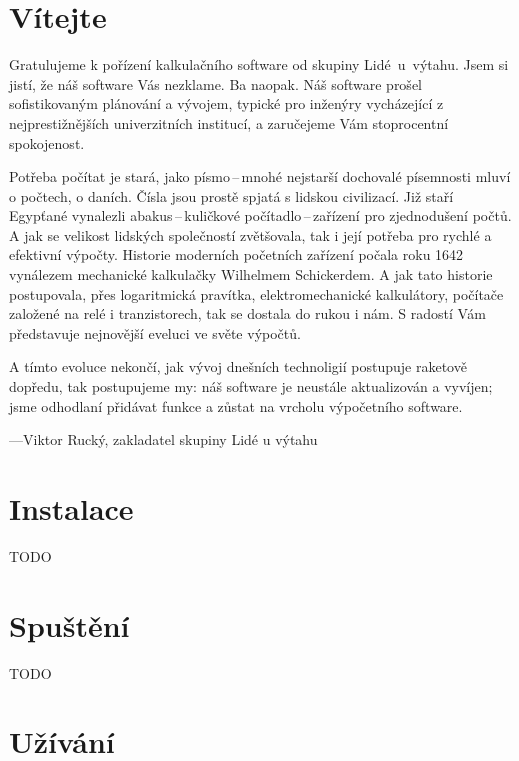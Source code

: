 \documentclass[a5paper,8pt,twoside]{extarticle}
\newcommand*\cleartoleftpage{%
  \clearpage
  \ifodd\value{page}\hbox{}\newpage\fi
}
\begin{document}
    \newpage
    \setcounter{page}{1}
    \tableofcontents
    
    \newpage

    \section*{Vítejte}
    Gratulujeme k pořízení kalkulačního software od skupiny Lidé~u~výtahu. Jsem si jistí, že náš software Vás nezklame. Ba naopak. Náš software prošel sofistikovaným plánování a vývojem, typické pro inženýry vycházející z nejprestižnějších univerzitních institucí, a zaručejeme Vám stoprocentní spokojenost.

    Potřeba počítat je stará, jako písmo\,--\,mnohé nejstarší dochovalé písemnosti mluví o počtech, o daních. Čísla jsou prostě spjatá s lidskou civilizací. Již staří Egypťané vynalezli abakus\,--\,kuličkové počítadlo\,--\,zařízení pro zjednodušení počtů. A jak se velikost lidských společností zvětšovala, tak i její potřeba pro rychlé a efektivní výpočty. Historie moderních početních zařízení počala roku 1642 vynálezem mechanické kalkulačky Wilhelmem Schickerdem. A jak tato historie postupovala, přes logaritmická pravítka, elektromechanické kalkulátory, počítače založené na relé i tranzistorech, tak se dostala do rukou i nám. S radostí Vám představuje nejnovější eveluci ve světe výpočtů.

    A tímto evoluce nekončí, jak vývoj dnešních technoligií postupuje raketově dopředu, tak postupujeme my: náš software je neustále aktualizován a vyvíjen; jsme odhodlaní přidávat funkce a zůstat na vrcholu výpočetního software.
    
    ---Viktor Rucký, zakladatel skupiny Lidé u výtahu
    \newpage
    \section{Instalace}
    TODO
    \section{Spuštění}
    TODO
    \cleartoleftpage
    \section{Užívání}
\end{document}

